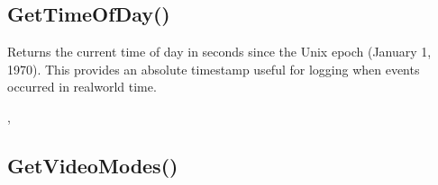 \documentclass[letterpaper,10pt,english]{sphinxmanual}
\begin{document}
\ignorespaces 

\subsection{GetTimeOfDay()}
\label{\detokenize{reference/peblenvironment:gettimeofday}}\label{\detokenize{reference/peblenvironment:index-27}}
\sphinxAtStartPar
{}

\sphinxAtStartPar
{}

\sphinxAtStartPar
Returns the current time of day in seconds since the Unix epoch (January 1, 1970). This provides an absolute timestamp useful for logging when events occurred in real\sphinxhyphen{}world time.

\sphinxAtStartPar
{}

\begin{sphinxVerbatim}[commandchars=\\\{\}]
\end{sphinxVerbatim}

\sphinxAtStartPar
{}

\begin{sphinxVerbatim}[commandchars=\\\{\}]
\end{sphinxVerbatim}

\sphinxAtStartPar
{}

\sphinxAtStartPar
{}, 

\ignorespaces 

\subsection{GetVideoModes()}
\label{\detokenize{reference/peblenvironment:getvideomodes}}\label{\detokenize{reference/peblenvironment:index-28}}
\sphinxAtStartPar
{}

\sphinxAtStartPar
{}
\end{document}
